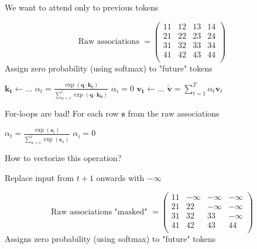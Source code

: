\documentclass[12pt,aspectratio=169,handout]{beamer}
\begin{document}
\begin{frame}{We want to attend only to previous tokens}
\begin{small}
\vspace{-2em}
	$$
	\text{Raw associations } =
	\begin{pmatrix}
		11 & 12 & 13 & 14 \\
		21 & 22 & 23 & 24 \\
		31 & 32 & 33 & 34 \\
		41 & 42 & 43 & 44 \\
	\end{pmatrix}
	$$
	Assign zero probability (using softmax) to "future" tokens
\end{small}

	\begin{algorithmic}[1]

	\State $\bm{k_t} \gets \ldots$
	\State $\alpha_{t} = \frac{
		\exp(\bm{q} \cdot \bm{k_t} )
	}{
		\sum_{u = 1}^{t}\exp(\bm{q} \cdot \bm{k_u} )
	}$
	\State $\alpha_i = 0$
	\EndFor
	\State $\bm{v_t} \gets \ldots$
	\EndFor
	\State \Return $\bm{\tilde v} = \sum_{t=1}^T \alpha_t \bm{v}_t$

\end{algorithmic}


\end{frame}


\begin{frame}{For-loops are bad!}
For each row $\bm{s}$ from the raw associations

\begin{algorithmic}[1]
	\State $\alpha_{t} = \frac{
		\exp(\bm{s}_t )
	}{
		\sum_{u = 1}^{t}\exp(\bm{s}_u )
	}$
	\State $\alpha_i = 0$
	\EndFor	
\end{algorithmic}

How to vectorize this operation?

\pause

Replace input from  $t + 1$ onwards with $-\infty$
\begin{small}
	$$
	\text{Raw associations "masked" } =
	\begin{pmatrix}
		11 & -\infty & -\infty & -\infty \\
		21 & 22 & -\infty & -\infty \\
		31 & 32 & 33 & -\infty \\
		41 & 42 & 43 & 44 \\
	\end{pmatrix}
	$$
	Assigns zero probability (using softmax) to "future" tokens
\end{small}



\end{frame}
\end{document}
